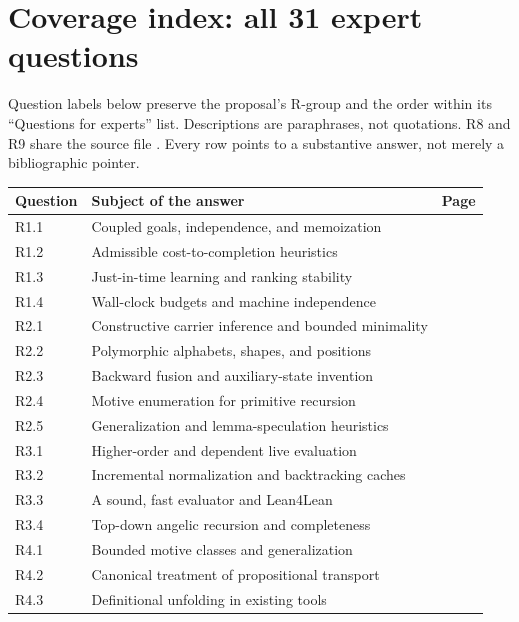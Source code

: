 \clearpage
\appendix
\section{Coverage index: all 31 expert questions}
\label{app:index}

Question labels below preserve the proposal's R-group and the order within its ``Questions for experts'' list. Descriptions are paraphrases, not quotations. R8 and R9 share the source file . Every row points to a substantive answer, not merely a bibliographic pointer.

\begin{longtable}{@{}p{.11\linewidth}p{.74\linewidth}r@{}}
\toprule
Question & Subject of the answer & Page\\
\midrule
\endhead
R1.1 & Coupled goals, independence, and memoization & \pageref{q:R1.1}\\
R1.2 & Admissible cost-to-completion heuristics & \pageref{q:R1.2}\\
R1.3 & Just-in-time learning and ranking stability & \pageref{q:R1.3}\\
R1.4 & Wall-clock budgets and machine independence & \pageref{q:R1.4}\\
R2.1 & Constructive carrier inference and bounded minimality & \pageref{q:R2.1}\\
R2.2 & Polymorphic alphabets, shapes, and positions & \pageref{q:R2.2}\\
R2.3 & Backward fusion and auxiliary-state invention & \pageref{q:R2.3}\\
R2.4 & Motive enumeration for primitive recursion & \pageref{q:R2.4}\\
R2.5 & Generalization and lemma-speculation heuristics & \pageref{q:R2.5}\\
R3.1 & Higher-order and dependent live evaluation & \pageref{q:R3.1}\\
R3.2 & Incremental normalization and backtracking caches & \pageref{q:R3.2}\\
R3.3 & A sound, fast evaluator and Lean4Lean & \pageref{q:R3.3}\\
R3.4 & Top-down angelic recursion and completeness & \pageref{q:R3.4}\\
R4.1 & Bounded motive classes and generalization & \pageref{q:R4.1}\\
R4.2 & Canonical treatment of propositional transport & \pageref{q:R4.2}\\
R4.3 & Definitional unfolding in existing tools & \pageref{q:R4.3}\\

\end{longtable}
